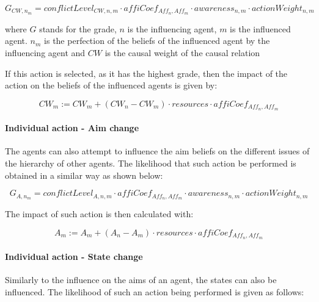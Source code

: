\begin{equation}\label{eq:likelihoodFraming}
G_{CW, n_m} = conflictLevel_{CW, n, m} \cdot affiCoef_{Aff_n,Aff_m} \cdot awareness_{n,m} \cdot actionWeight_{n,m}
\end{equation}

where $G$ stands for the grade, $n$ is the influencing agent, $m$ is the influenced agent. $n_m$ is the perfection of the beliefs of the influenced agent by the influencing agent and $CW$ is the causal weight of the causal relation

If this action is selected, as it has the highest grade, then the impact of the action on the beliefs of the influenced agents is given by:

\begin{equation}\label{eq:impactFraming}
CW_{m} := CW_{m} + \left(CW_{n} - CW_{m} \right) \cdot resources \cdot affiCoef_{Aff_n,Aff_m}
\end{equation}

\paragraph{Individual action - Aim change}

The agents can also attempt to influence the aim beliefs on the different issues of the hierarchy of other agents. The likelihood that such action be performed is obtained in a similar way as shown below:

\begin{equation}\label{eq:likelihoodAimChange}
G_{A, n_m} = conflictLevel_{A, n, m} \cdot affiCoef_{Aff_n,Aff_m} \cdot awareness_{n,m} \cdot actionWeight_{n,m}
\end{equation}

The impact of such action is then calculated with:

\begin{equation}\label{eq:impactAimChange}
A_{m} := A_{m} + \left(A_{n} - A_{m} \right) \cdot resources \cdot affiCoef_{Aff_n,Aff_m}
\end{equation}

\paragraph{Individual action - State change}

Similarly to the influence on the aims of an agent, the states can also be influenced. The likelihood of such an action being performed is given as follows:

